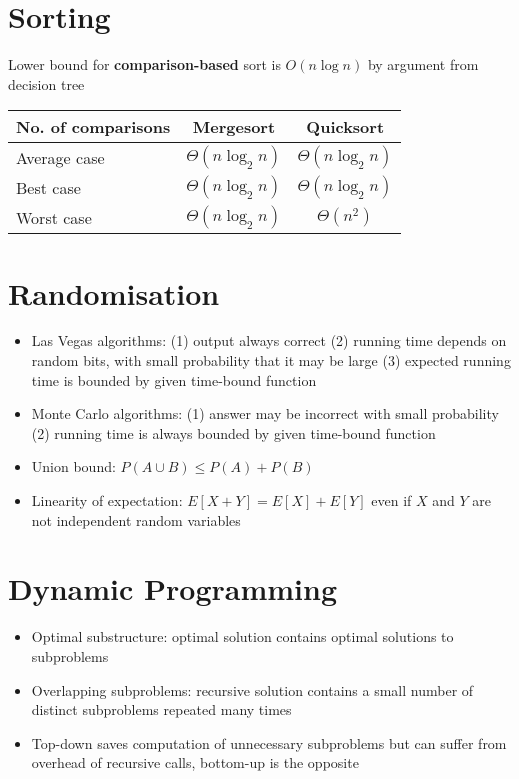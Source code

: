 \documentclass[11pt]{article}
\theoremstyle{remark}
\begin{document}
\section{Sorting}
Lower bound for \textbf{comparison-based} sort is $O(n\log n)$ by argument from decision tree
\begin{center}
    \begin{tabular}{l|c|c}
        No. of comparisons & Mergesort & Quicksort\\
        \hline
        Average case & $\Theta(n\log_2 n)$ & $\Theta(n\log_2n)$\\
        Best case & $\Theta(n\log_2n)$ & $\Theta(n\log_2n)$\\
        Worst case & $\Theta(n\log_2n)$ & $\Theta(n^2)$
    \end{tabular}
\end{center}

\section{Randomisation}
\begin{itemize}
    \item Las Vegas algorithms: (1) output always correct (2) running time depends on random bits, with
        small probability that it may be large (3) expected running time is bounded by given time-bound
        function
    \item Monte Carlo algorithms: (1) answer may be incorrect with small probability (2) running time is always bounded by given time-bound function
    \item Union bound: $P(A\cup B)\leq P(A)+P(B)$
    \item Linearity of expectation:  $E[X+Y]=E[X]+E[Y]$ even if  $X$ and  $Y$ are not independent random
        variables
\end{itemize}
\section{Dynamic Programming}
\begin{itemize}
    \item Optimal substructure: optimal solution contains optimal solutions to subproblems
    \item Overlapping subproblems: recursive solution contains a small number of distinct subproblems
        repeated many times
    \item Top-down saves computation of unnecessary subproblems but can suffer from
        overhead of recursive calls, bottom-up is the opposite
\end{itemize}
\end{document}
